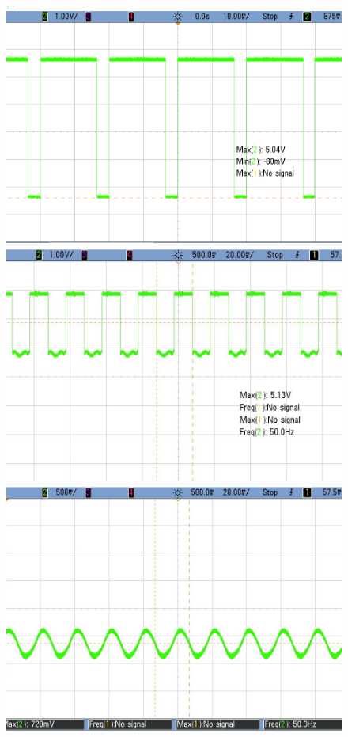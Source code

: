 \begin{figure}[h!]
        \centering
        \includegraphics[scale=0.19]{../Exercise5/cmos_cerda2.png}\hspace{1cm}
        \includegraphics[scale=0.2]{../Exercise5/cmos_dads.jpeg}\\
		\vspace{0.2cm}
	   \includegraphics[scale=0.19]{../Exercise5/cmos_ahifdas.jpeg} 

\end{figure}
